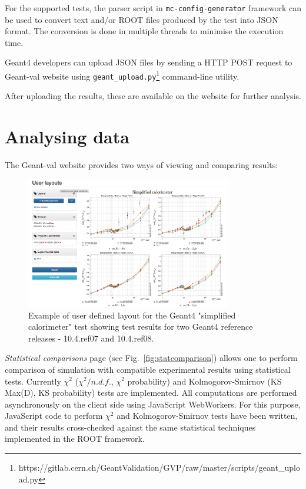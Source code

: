 For the supported tests, the parser script in {\tt mc-config-generator} framework can be used to convert text and/or ROOT files produced by the test into JSON format. The conversion is done in multiple threads to minimise the execution time.

Geant4 developers can upload JSON files by sending a HTTP POST request to \textsf{Geant-val} website using {\tt geant\_upload.py}\footnote{https://gitlab.cern.ch/GeantValidation/GVP/raw/master/scripts/geant\_upload.py} command-line utility.

After uploading the results, these are available on the website for further analysis.

\section{Analysing data}
\label{sec-analyse}

The \textsf{Geant-val} website provides two ways of viewing and comparing results:

\begin{figure}[h]
    \centering
    \includegraphics[width=0.8\textwidth,clip]{layout_sc.png}
    \caption{Example of user defined layout for the Geant4 "simplified calorimeter" test showing test results for two Geant4 reference releases - 10.4.ref07 and 10.4.ref08.}
    \label{fig:layouts}
\end{figure}

\textit{Statistical comparisons} page (see Fig.~\ref{fig:statcomparison}) allows one to perform comparison of simulation with compatible experimental results using statistical tests. %
Currently $\chi^2$ ($\chi^2/n.d.f.$, $\chi^2$ probability) and Kolmogorov-Smirnov (KS Max(D), KS probability) tests are implemented. All computations are performed asynchronously on the client side using JavaScript WebWorkers. For this purpose, JavaScript code to perform $\chi^2$ and Kolmogorov-Smirnov tests have been written, and their results cross-checked against the same statistical techniques implemented in the ROOT framework.

